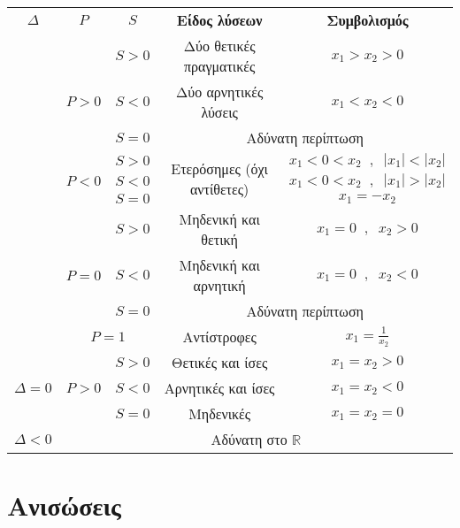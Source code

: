 \documentclass[twoside,11pt,a4paper,openany]{book}
\begin{document}
\begin{center}
\begin{longtable}{c|c|c|cc}
\hline \rule[-2ex]{0pt}{5.5ex} \boldmath$\varDelta$ & \boldmath$P$ & \boldmath$S$ & \textbf{Είδος λύσεων} & \textbf{Συμβολισμός}\\ 
\hhline{=====} \rule[-2ex]{0pt}{5.5ex}  &  & $ S>0 $ & Δύο θετικές πραγματικές & $ x_1>x_2>0 $ \\ 
\hhline{~|~-~~} \multirow{15}{*}{$ \varDelta>0 $}  & $ P>0 $ & $ S<0 $ & Δύο αρνητικές λύσεις & $ x_1<x_2<0 $ \rule[-2ex]{0pt}{5.5ex}\\ 
\hhline{~|~-~~}   &  & $ S=0 $ & \multicolumn{2}{c}{Αδύνατη περίπτωση}  \rule[-2ex]{0pt}{5.5ex}\\ 
\hhline{~|----}   &  & $ S>0 $ & \multirow{3}{*}{Ετερόσημες (όχι αντίθετες)} & $ x_1<0<x_2\;\;,\;\;|x_1|<|x_2| $ \rule[-2ex]{0pt}{5.5ex}\\ 
\hhline{~|~-~~} \rule[-2ex]{0pt}{5.5ex}  & $ P<0 $ & $ S<0 $ &  & $ x_1<0<x_2\;\;,\;\;|x_1|>|x_2| $ \\ 
\hhline{~|~-~~} \rule[-2ex]{0pt}{5.5ex}  &  & $ S=0 $ & Αντίθετες  & $ x_1=-x_2 $ \\ 
\hhline{~|----} \rule[-2ex]{0pt}{5.5ex}  &  & $ S>0 $ & Μηδενική και θετική & $ x_1=0\;\;,\;\;x_2>0 $ \\ 
\hhline{~|~-~~} \rule[-2ex]{0pt}{5.5ex}  & $ P=0 $ & $ S<0 $ & Μηδενική και αρνητική & $ x_1=0\;\;,\;\;x_2<0 $ \\ 
\hhline{~|~-~~} \rule[-2ex]{0pt}{5.5ex}  &  & $ S=0 $ &  \multicolumn{2}{c}{Αδύνατη περίπτωση}  \\ 
\hhline{~|----} \rule[-2ex]{0pt}{5.5ex}  & \multicolumn{2}{c|}{$ P=1 $} & Αντίστροφες & $ x_1=\frac{1}{x_2} $  \\ 
\hhline{-----}   & \multirow{3}{*}{$ P>0 $} & $ S>0 $ & Θετικές και ίσες  & $ x_1=x_2>0 $ \rule[-2ex]{0pt}{5.5ex}\\ 
\hhline{~|~|-|~~} \rule[-2ex]{0pt}{5.5ex} $ \varDelta=0 $ &  & $ S<0 $ & Αρνητικές και ίσες & $ x_1=x_2<0 $ \\ 
\hhline{~|--|~~} \rule[-2ex]{0pt}{5.5ex}  & $ P=0 $ & $ S=0 $ & Μηδενικές & $ x_1=x_2=0 $ \\ 
\hhline{-----} \rule[-2ex]{0pt}{5.5ex} $ \varDelta<0 $ & \multicolumn{4}{c}{Αδύνατη στο $ \mathbb{R} $}  \\ 
\hline 
\end{longtable}
\end{center}
\chapter{Ανισώσεις}
\end{document}
